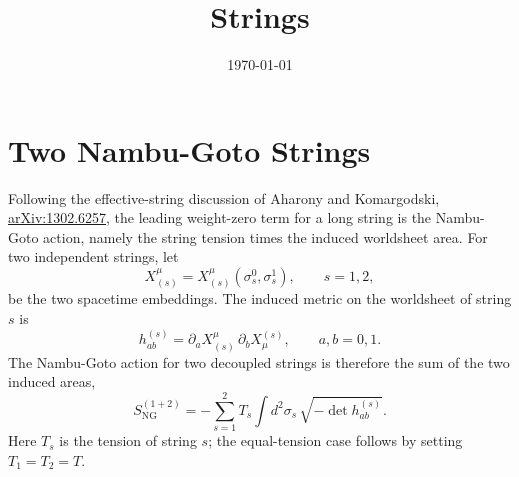 \documentclass[%
preprint,
amsmath,amssymb,
aps,
prd,
10pt
]{revtex4-2}
\begin{document}
\title{Strings}

\date{\today}
\maketitle

\section{Two Nambu-Goto Strings}

Following the effective-string discussion of Aharony and Komargodski,
\href{https://arxiv.org/abs/1302.6257}{arXiv:1302.6257}, the leading
weight-zero term for a long string is the Nambu-Goto action, namely the
string tension times the induced worldsheet area.  For two independent
strings, let
\begin{equation}
  X_{(s)}^{\mu} = X_{(s)}^{\mu}(\sigma_s^0,\sigma_s^1),
  \qquad s=1,2,
\end{equation}
be the two spacetime embeddings.  The induced metric on the worldsheet of
string $s$ is
\begin{equation}
  h^{(s)}_{ab}
  = \partial_a X_{(s)}^{\mu}\,\partial_b X^{(s)}_{\mu},
  \qquad a,b=0,1 .
\end{equation}
The Nambu-Goto action for two decoupled strings is therefore the sum of the
two induced areas,
\begin{equation}
  S_{\mathrm{NG}}^{(1+2)}
  =
  -\sum_{s=1}^{2} T_s \int d^2\sigma_s\,
  \sqrt{-\det h^{(s)}_{ab}} .
  \label{eq:two-string-ng-covariant}
\end{equation}
Here $T_s$ is the tension of string $s$; the equal-tension case follows by
setting $T_1=T_2=T$.
\end{document}
